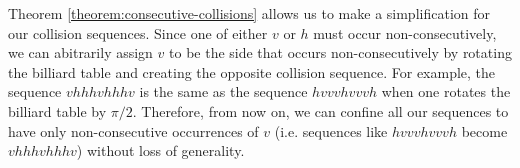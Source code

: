 Theorem \ref{theorem:consecutive-collisions} allows us to make a simplification for our collision sequences. Since one of either $v$ or $h$ must occur non-consecutively, we can abitrarily assign $v$ to be the side that occurs non-consecutively by rotating the billiard table and creating the opposite collision sequence. For example, the sequence $vhhhvhhhv$ is the same as the sequence $hvvvhvvvh$ when one rotates the billiard table by $\pi/2$. Therefore, from now on, we can confine all our sequences to have only non-consecutive occurrences of $v$ (i.e. sequences like $hvvvhvvvh$ become $vhhhvhhhv$) without loss of generality.
